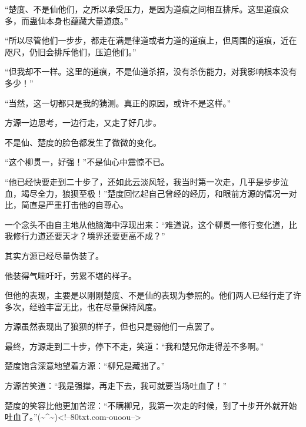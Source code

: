 \begin{this_body}
“楚度、不是仙他们，之所以承受压力，是因为道痕之间相互排斥。这里道痕众多，而蛊仙本身也蕴藏大量道痕。”

“所以尽管他们一步步，都走在满是律道或者力道的道痕上，但周围的道痕，近在咫尺，仍旧会排斥他们，压迫他们。”

“但我却不一样。这里的道痕，不是仙道杀招，没有杀伤能力，对我影响根本没有多少！”

“当然，这一切都只是我的猜测。真正的原因，或许不是这样。”

方源一边思考，一边行走，又走了好几步。

不是仙、楚度的脸色都发生了微微的变化。

“这个柳贯一，好强！”不是仙心中震惊不已。

“他已经快要走到二十步了，还如此云淡风轻，我当时第一次走，几乎是步步泣血，竭尽全力，狼狈至极！”楚度回忆起自己曾经的经历，和眼前方源的情况一对比，简直是严重打击他的自尊心。

一个念头不由自主地从他脑海中浮现出来：“难道说，这个柳贯一修行变化道，比我修行力道还要天才？境界还要更高不成？”

其实方源已经尽量伪装了。

他装得气喘吁吁，劳累不堪的样子。

但他的表现，主要是以刚刚楚度、不是仙的表现为参照的。他们两人已经行走了许多次，经验丰富无比，也在尽量保持风度。

方源虽然表现出了狼狈的样子，但也只是弱他们一点罢了。

最终，方源走到二十步，停下不走，笑道：“我和楚兄你走得差不多啊。”

楚度饱含深意地望着方源：“柳兄是藏拙了。”

方源苦笑道：“我是强撑，再走下去，我可就要当场吐血了！”

楚度的笑容比他更加苦涩：“不瞒柳兄，我第一次走的时候，到了十步开外就开始吐血了。”(\~{}\^{}\~{})<!--80txt.com-ouoou-->

\end{this_body}

